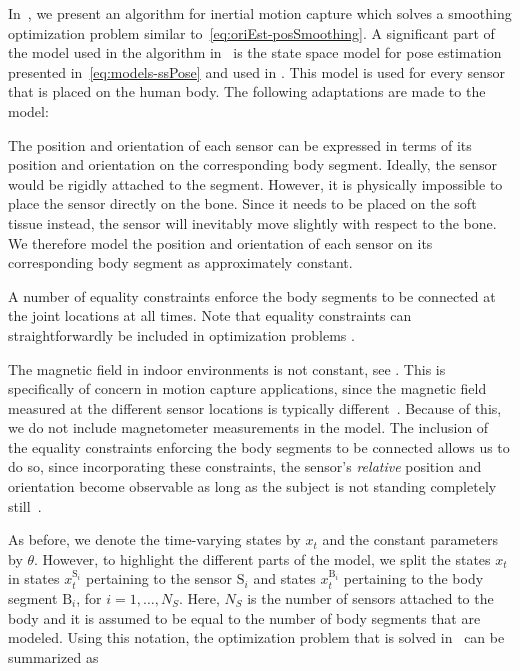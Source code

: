 In~\cite{kokHS:2014}, we present an algorithm for inertial motion capture which solves a smoothing optimization problem similar to~\eqref{eq:oriEst-posSmoothing}. A significant part of the model used in the algorithm in~\cite{kokHS:2014} is the state space model for pose estimation presented in~\eqref{eq:models-ssPose} and used in . This model is used for every sensor that is placed on the human body. The following adaptations are made to the model: 
\begin{description}[style=unboxed]
\item[Placement of the sensors on the body segments.]
The position and orientation of each sensor can be expressed in terms of its position and orientation on the corresponding body segment. Ideally, the sensor would be rigidly attached to the segment. However, it is physically impossible to place the sensor directly on the bone. Since it needs to be placed on the soft tissue instead, the sensor will inevitably move slightly with respect to the bone. We therefore model the position and orientation of each sensor on its corresponding body segment as 
approximately constant.
\item[Joints between the body segments.] A number of equality constraints enforce the body segments to be connected at the joint locations at all times. Note that equality constraints can straightforwardly be included in optimization problems \citep{boydV:2004,nocedalW:2006}.
\item[Exclusion of magnetometer measurements.] The magnetic field in indoor environments is not constant, see \eg \cite{ligorioS:2016}. This is specifically of concern in motion capture applications, since the magnetic field measured at the different sensor locations is typically different~\citep{luingeVB:2007,cooper:2009,favreJAA:2008,seelRS:2014}. Because of this, we do not include magnetometer measurements in the model. The inclusion of the equality constraints enforcing the body segments to be connected allows us to do so, since incorporating these constraints, the sensor's \textit{relative} position and orientation become observable as long as the subject is not standing completely still~\citep{hol:2011}.
\end{description}
As before, we denote the time-varying states by $x_t$ and the constant parameters by $\theta$. However, to highlight the different parts of the model, we split the states $x_t$ in states $x^{\text{S}_i}_t$ pertaining to the sensor $\text{S}_i$ and states $x^{\text{B}_i}_t$ pertaining to the body segment $\text{B}_i$, for $i = 1, \hdots , N_S$. Here, $N_S$ is the number of sensors attached to the body and it is assumed to be equal to the number of body segments that are modeled. Using this notation, the optimization problem that is solved in~\cite{kokHS:2014} can be summarized as
